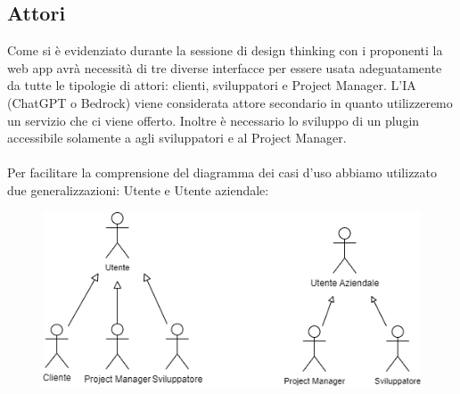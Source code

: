 \documentclass{article}
\begin{document}
\subsection*{Attori}
Come si è evidenziato durante la sessione di design thinking con i proponenti la web app avrà necessità di tre diverse interfacce per essere usata adeguatamente da tutte le tipologie di attori: clienti, sviluppatori e Project Manager. L'IA (ChatGPT o Bedrock) viene considerata attore secondario in quanto utilizzeremo un servizio che ci viene offerto. Inoltre è necessario lo sviluppo di un plugin accessibile solamente a agli sviluppatori e al Project Manager.\\\\

Per facilitare la comprensione del diagramma dei casi d'uso abbiamo utilizzato due generalizzazioni: Utente e Utente aziendale: 

\begin{figure}[h]
    \centering
    \includegraphics{./imgUML/Attori.png}
    \label{fig:immagine}
\end{figure}
\end{document}
